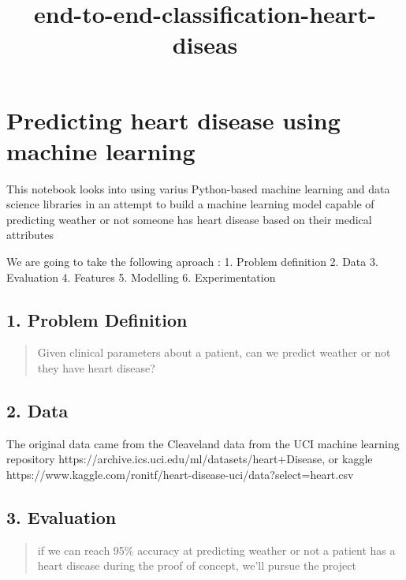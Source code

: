 \documentclass[11pt]{article}
\title{end-to-end-classification-heart-diseas}
\begin{document}
    
    \maketitle
    
    

    
    \hypertarget{predicting-heart-disease-using-machine-learning}{%
\section{Predicting heart disease using machine
learning}\label{predicting-heart-disease-using-machine-learning}}

This notebook looks into using varius Python-based machine learning and
data science libraries in an attempt to build a machine learning model
capable of predicting weather or not someone has heart disease based on
their medical attributes

We are going to take the following aproach : 1. Problem definition 2.
Data 3. Evaluation 4. Features 5. Modelling 6. Experimentation

    \hypertarget{problem-definition}{%
\subsection{1. Problem Definition}\label{problem-definition}}

\begin{quote}
Given clinical parameters about a patient, can we predict weather or not
they have heart disease?
\end{quote}

    \hypertarget{data}{%
\subsection{2. Data}\label{data}}

The original data came from the Cleaveland data from the UCI machine
learning repository
https://archive.ics.uci.edu/ml/datasets/heart+Disease, or kaggle
https://www.kaggle.com/ronitf/heart-disease-uci/data?select=heart.csv

    \hypertarget{evaluation}{%
\subsection{3. Evaluation}\label{evaluation}}

\begin{quote}
if we can reach 95\% accuracy at predicting weather or not a patient has
a heart disease during the proof of concept, we'll pursue the project
\end{quote}
\end{document}
